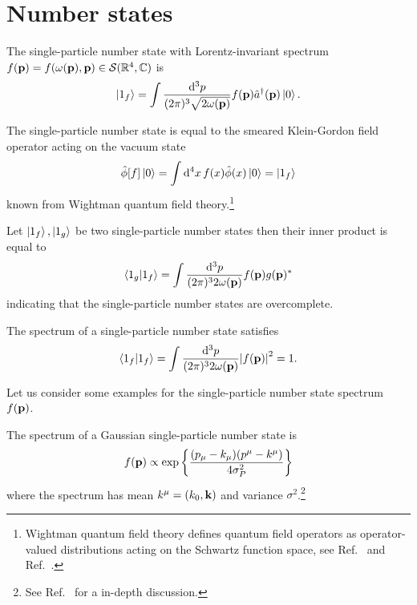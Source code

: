 \section{Number states}

\begin{definition}\label{def:single_particle_number_state}
	The single-particle number state with Lorentz-invariant spectrum $f(\vb{p})=f(\omega(\vb{p}),\vb{p})\in\mathcal{S}(\mathbb{R}^4,\mathbb{C})$ is
	\begin{equation}
		\ket{1_f}
		=
		\int\frac{\dd[3]{p}}{(2\pi)^3\sqrt{2\omega(\vb{p})}}
		f(\vb{p})
		\hat{a}^\dagger(\vb{p})
		\ket{0}
		.
	\end{equation}
\end{definition}
\begin{lemma}\label{thm:single_particle_number_state_smeared_kg}
	The single-particle number state is equal to the smeared Klein-Gordon field operator acting on the vacuum state
	\begin{equation}
		\hat\phi[f]
		\ket{0}
		=
		\int\dd[4]{x}
		f(x)
		\hat\phi(x)
		\ket{0}
		=
		\ket{1_f}
	\end{equation}
	known from Wightman quantum field theory.\footnote{Wightman quantum field theory defines quantum field operators as operator-valued distributions acting on the Schwartz function space, see Ref.~\cite{Bogolubov1989} and Ref.~\cite{Streater2016}.}
\end{lemma}
\begin{lemma}\label{th:single_particle_number_states_inner_product}
	Let $\ket{1_f},\ket{1_g}$ be two single-particle number states then their inner product is equal to
	\begin{equation}
		\braket{1_g}{1_f}
		=
		\int\frac{\dd[3]{p}}{(2\pi)^32\omega(\vb{p})}
		f(\vb{p})g(\vb{p})^*
	\end{equation}
	indicating that the single-particle number states are overcomplete.
\end{lemma}
\begin{lemma}\label{thm:single_particle_number_state_normalization}
	The spectrum of a single-particle number state satisfies
	\begin{equation}
		\bra{1_f}\ket{1_f}
		=
		\int\frac{\dd[3]{p}}{(2\pi)^32\omega(\vb{p})}
		\abs{f(\vb{p})}^2
		=
		1
		.
	\end{equation}
\end{lemma}
Let us consider some examples for the single-particle number state spectrum $f(\vb{p})$.
\begin{example}
	The spectrum of a Gaussian single-particle number state is
	\begin{equation}
		f(\vb{p})
		\propto
		\exp\left\{
			\frac{(p_\mu-k_\mu)(p^\mu-k^\mu)}{4\sigma_P^2}
		\right\}
		\label{eq:covariant_gaussian_spectrum}
	\end{equation}
	where the spectrum has mean $k^\mu=(k_0,\vb{k})$ and variance $\sigma^2$.\footnote{See Ref.~\cite{Naumov2013,Naumov2009} for a in-depth discussion.}
\end{example}
